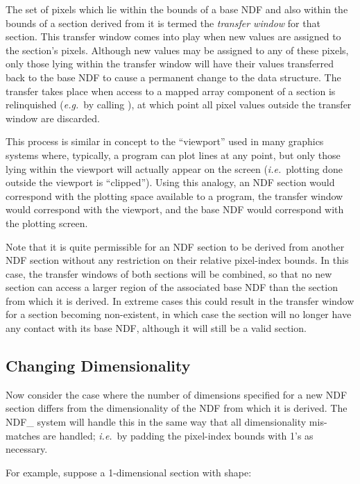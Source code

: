 \documentclass[twoside,11pt,nolof]{starlink}
\providecommand{\st}[1]{{\emph{#1}}}
\begin{document}
The set of pixels which lie within the bounds of a base NDF and also within
the bounds of a section derived from it is termed the \st{transfer window\/}
for that section.
This transfer window comes into play when new values are assigned to the
section's pixels.
Although new values may be assigned to any of these pixels, only those lying
within the transfer window will have their values transferred back to the
base NDF to cause a permanent change to the data structure.
The transfer takes place when access to a mapped array component of a
section is relinquished (\st{e.g.}\ by calling ), at which point
all pixel values outside the transfer window are discarded.

This process is similar in concept to the ``viewport'' used in many graphics
systems where, typically, a program can plot lines at any point, but only
those lying within the viewport will actually appear on the screen (\st{i.e.}\ plotting done outside the viewport is ``clipped'').
Using this analogy, an NDF section would correspond with the plotting space
available to a program, the transfer window would correspond with the
viewport, and the base NDF would correspond with the plotting screen.

Note that it is quite permissible for an NDF section to be derived from
another NDF section without any restriction on their relative pixel-index
bounds.
In this case, the transfer windows of both sections will be combined, so
that no new section can access a larger region of the associated base NDF
than the section from which it is derived.
In extreme cases this could result in the transfer window for a section
becoming non-existent, in which case the section will no longer have any
contact with its base NDF, although it will still be a valid section.

\subsection{\label{ss:changingdimensionality}Changing Dimensionality}

Now consider the case where the number of dimensions specified for a new NDF
section differs from the dimensionality of the NDF from which it is derived.
The NDF\_ system will handle this in the same way that all dimensionality
mis-matches are handled; \st{i.e.}\ by padding the pixel-index bounds with
1's as necessary.

For example, suppose a 1-dimensional section with shape:
\end{document}
